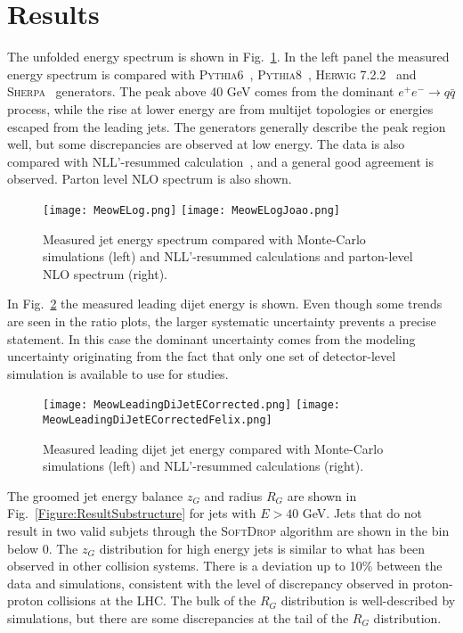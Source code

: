 \documentclass[a4paper,11pt]{article}
\begin{document}
\section{Results}

The unfolded energy spectrum is shown in Fig.~\ref{Figure:ResultEnergy}.  In the left panel the measured energy spectrum is compared with \textsc{Pythia}6~\cite{Sjostrand:2000wi}, \textsc{Pythia}8~\cite{Sjostrand:2014zea}, \textsc{Herwig} 7.2.2~\cite{Bellm:2015jjp} and \textsc{Sherpa}~\cite{Gleisberg:2008ta} generators.  The peak above 40 GeV comes from the dominant $e^+e^-\rightarrow q\bar{q}$ process, while the rise at lower energy are from multijet topologies or energies escaped from the leading jets.  The generators generally describe the peak region well, but some discrepancies are observed at low energy.  The data is also compared with NLL'-resummed calculation~\cite{Neill:2021std}, and a general good agreement is observed.  Parton level NLO spectrum is also shown.

\begin{figure}[ht!]
    \centering
    \texttt{[image: MeowELog.png]}
    \texttt{[image: MeowELogJoao.png]}
    \caption{Measured jet energy spectrum compared with Monte-Carlo simulations (left) and NLL'-resummed calculations and parton-level NLO spectrum (right).}
    \label{Figure:ResultEnergy}
\end{figure}

In Fig.~\ref{Figure:ResultLeadingDijetEnergy} the measured leading dijet energy is shown.  Even though some trends are seen in the ratio plots, the larger systematic uncertainty prevents a precise statement.  In this case the dominant uncertainty comes from the modeling uncertainty originating from the fact that only one set of detector-level simulation is available to use for studies.

\begin{figure}[ht!]
    \centering
    \texttt{[image: MeowLeadingDiJetECorrected.png]}
    \texttt{[image: MeowLeadingDiJetECorrectedFelix.png]}
    \caption{Measured leading dijet jet energy compared with Monte-Carlo simulations (left) and NLL'-resummed calculations (right).}
    \label{Figure:ResultLeadingDijetEnergy}
\end{figure}

The groomed jet energy balance $z_G$ and radius $R_G$ are shown in Fig.~\ref{Figure:ResultSubstructure} for jets with $E > 40$ GeV.  Jets that do not result in two valid subjets through the \textsc{SoftDrop} algorithm are shown in the bin below 0.  The $z_G$ distribution for high energy jets is similar to what has been observed in other collision systems.  There is a deviation up to 10\% between the data and simulations, consistent with the level of discrepancy observed in proton-proton collisions at the LHC.  The bulk of the $R_G$ distribution is well-described by simulations, but there are some discrepancies at the tail of the $R_G$ distribution.
\end{document}
